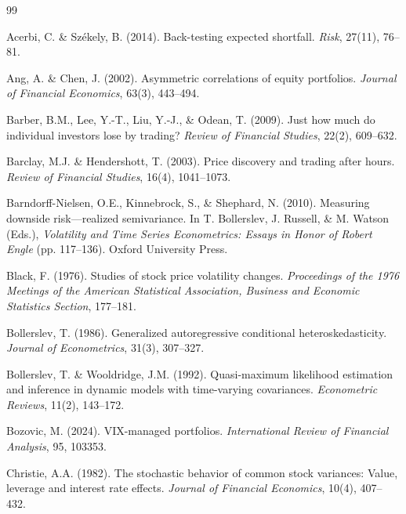 \documentclass[12pt,a4paper]{article}
\begin{document}



\begin{thebibliography}{99}

Acerbi, C. \& Sz\'{e}kely, B. (2014). Back-testing expected shortfall. \textit{Risk}, 27(11), 76--81.

Ang, A. \& Chen, J. (2002). Asymmetric correlations of equity portfolios. \textit{Journal of Financial Economics}, 63(3), 443--494.

Barber, B.M., Lee, Y.-T., Liu, Y.-J., \& Odean, T. (2009). Just how much do individual investors lose by trading? \textit{Review of Financial Studies}, 22(2), 609--632.

Barclay, M.J. \& Hendershott, T. (2003). Price discovery and trading after hours. \textit{Review of Financial Studies}, 16(4), 1041--1073.

Barndorff-Nielsen, O.E., Kinnebrock, S., \& Shephard, N. (2010). Measuring downside risk---realized semivariance. In T. Bollerslev, J. Russell, \& M. Watson (Eds.), \textit{Volatility and Time Series Econometrics: Essays in Honor of Robert Engle} (pp. 117--136). Oxford University Press.

Black, F. (1976). Studies of stock price volatility changes. \textit{Proceedings of the 1976 Meetings of the American Statistical Association, Business and Economic Statistics Section}, 177--181.

Bollerslev, T. (1986). Generalized autoregressive conditional heteroskedasticity. \textit{Journal of Econometrics}, 31(3), 307--327.

Bollerslev, T. \& Wooldridge, J.M. (1992). Quasi-maximum likelihood estimation and inference in dynamic models with time-varying covariances. \textit{Econometric Reviews}, 11(2), 143--172.

Bozovic, M. (2024). VIX-managed portfolios. \textit{International Review of Financial Analysis}, 95, 103353.

Christie, A.A. (1982). The stochastic behavior of common stock variances: Value, leverage and interest rate effects. \textit{Journal of Financial Economics}, 10(4), 407--432.


\end{thebibliography}
\end{document}
